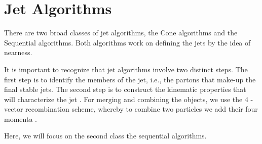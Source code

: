     

\section{Jet Algorithms}

There are two broad classes of jet algorithms, the Cone algorithms and the Sequential algorithms. Both algorithms work on defining the jets by the idea of nearness.

It is important to recognize that jet algorithms involve two distinct steps. The first step is to identify the members of the jet, i.e., the partons that make-up the final stable jets. The second step is to construct the kinematic properties that will characterize the jet \citep{Berger:2002jt}. For merging and combining the objects, we use the 4 -vector recombination scheme, whereby to combine two particles we add their four momenta \citep{Blazey:2000qt}. 

Here, we will focus on the second class
the sequential algorithms.  

%
%

